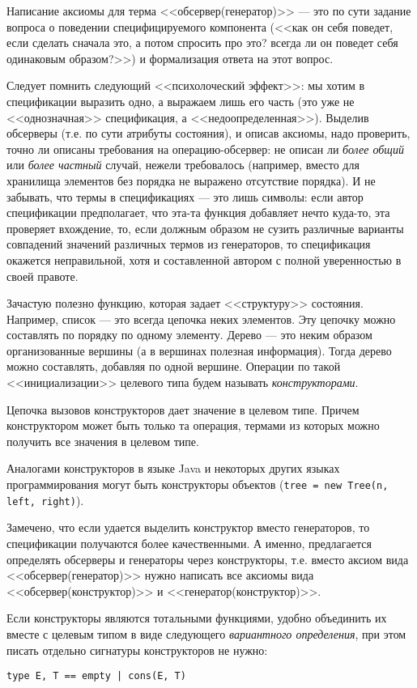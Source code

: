 Написание аксиомы для терма <<обсервер(генератор)>> --- это по сути задание вопроса о поведении специфицируемого компонента (<<как он себя поведет, если сделать сначала это, а потом спросить про это? всегда ли он поведет себя одинаковым образом?>>) и формализация ответа на этот вопрос.

Следует помнить следующий <<психолоческий эффект>>: мы хотим в спецификации выразить одно, а выражаем лишь его часть (это уже не <<однозначная>> спецификация, а <<недоопределенная>>). Выделив обсерверы (т.е. по сути атрибуты состояния), и описав аксиомы, надо проверить, точно ли описаны требования на операцию-обсервер: не описан ли \emph{более общий} или \emph{более частный} случай, нежели требовалось (например, вместо для хранилища элементов без порядка не выражено отсутствие порядка). И не забывать, что термы в спецификациях --- это лишь символы: если автор спецификации предполагает, что эта-та функция добавляет нечто куда-то, эта проверяет вхождение, то, если должным образом не сузить различные варианты совпадений значений различных термов из генераторов, то спецификация окажется неправильной, хотя и составленной автором с полной уверенностью в своей правоте.


Зачастую полезно функцию, которая задает <<структуру>> состояния. Например, список --- это всегда цепочка неких элементов. Эту цепочку можно составлять по порядку по одному элементу. Дерево --- это неким образом организованные вершины (а в вершинах полезная информация). Тогда дерево можно составлять, добавляя по одной вершине. Операции по такой <<инициализации>> целевого типа будем называть \emph{конструкторами}.

Цепочка вызовов конструкторов дает значение в целевом типе. Причем конструктором может быть только та операция, термами из которых можно получить все значения в целевом типе.

Аналогами конструкторов в языке Java и некоторых других языках программирования могут быть конструкторы объектов (\texttt{tree = new Tree(n, left, right)}).

Замечено, что если удается выделить конструктор вместо генераторов, то спецификации получаются более качественными. А именно, предлагается определять обсерверы и генераторы через конструкторы, т.е. вместо аксиом вида <<обсервер(генератор)>> нужно написать все аксиомы вида <<обсервер(конструктор)>> и <<генератор(конструктор)>>.

Если конструкторы являются тотальными функциями, удобно объединить их вместе с целевым типом в виде следующего \emph{вариантного определения}, при этом писать отдельно сигнатуры конструкторов не нужно:
\begin{lstlisting}
type E, T == empty | cons(E, T)
\end{lstlisting}

